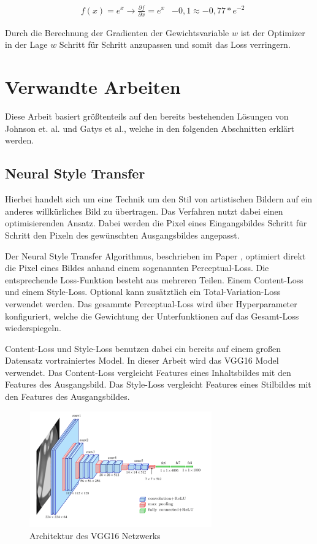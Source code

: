 \begin{align}
	& f(x) = e^{x} \rightarrow \frac{\partial f}{\partial x} = e^{x}
	& -0,1 \approx -0,77 * e^{-2}
\end{align}

Durch die Berechnung der Gradienten der Gewichtsvariable $ w $ ist der Optimizer in der Lage $ w $ Schritt für Schritt anzupassen und somit das Loss verringern.

\pagebreak

\section{Verwandte Arbeiten}

Diese Arbeit basiert größtenteils auf den bereits bestehenden Lösungen von Johnson et. al. und Gatys et al., welche in den folgenden Abschnitten erklärt werden.

\subsection{Neural Style Transfer}
\label{sec:neural_style_transfer}

Hierbei handelt sich um eine Technik um den Stil von artistischen Bildern auf ein anderes willkürliches Bild zu übertragen.
Das Verfahren nutzt dabei einen optimisierenden Ansatz. Dabei werden die Pixel eines Eingangsbildes Schritt für Schritt den Pixeln 
des gewünschten Ausgangsbildes angepasst. 

Der Neural Style Transfer Algorithmus, beschrieben im Paper \cite{DBLP:journals/corr/GatysEB15a}, optimiert direkt die Pixel eines Bildes anhand einem sogenannten Perceptual-Loss. Die entsprechende Loss-Funktion besteht aus mehreren Teilen. Einem Content-Loss und einem Style-Loss. Optional kann zusätztlich ein Total-Variation-Loss verwendet werden. Das gesammte Perceptual-Loss wird über Hyperparameter konfiguriert, welche die Gewichtung der Unterfunktionen auf das Gesamt-Loss wiederspiegeln.

Content-Loss und Style-Loss benutzen dabei ein bereits auf einem großen Datensatz vortrainiertes Model. In dieser Arbeit wird das VGG16 \cite{DBLP:journals/corr/SimonyanZ14a} Model verwendet. Das Content-Loss vergleicht Features eines Inhaltsbildes mit den Features des Ausgangsbild. Das Style-Loss vergleicht Features eines Stilbildes mit den Features des Ausgangsbildes.

\begin{figure}[H]
	\centering
	\includegraphics[width=0.70\textwidth]{resources/content/vgg16.png}
	\caption{Architektur des VGG16 Netzwerks \cite{vgg16_img}}
	\label{img:vgg16_img}
\end{figure}

